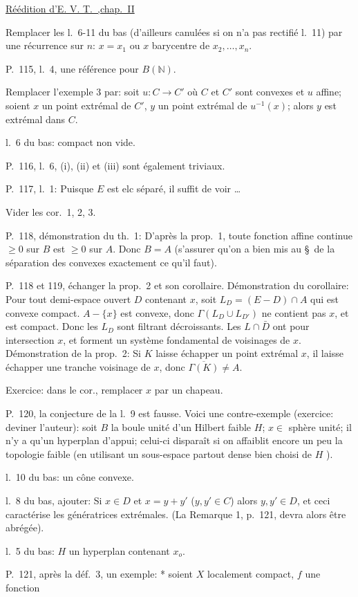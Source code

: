 \uline{Réédition d'E. V. T.\ ,chap.\ II} 

Remplacer les l.\ 6-11 du bas (d'ailleurs canulées si on n'a pas rectifié l.\ 11) par une récurrence sur $n$: $x=x_1$ ou $x$ barycentre de $x_2,\ldots,x_n$.

P.\ 115, l.\ 4, une référence pour $B(\mathbb{N})$.

Remplacer l'exemple 3 par: soit $u:C\longrightarrow C'$ où $C$ et $C'$ sont convexes et $u$ affine; soient $x$ un point extrémal de $C'$, $y$ un point extrémal de $u^{-1}(x)$; alors $y$ est extrémal dans $C$.

l.\ 6 du bas: compact non vide.

P.\ 116, l.\ 6, (i), (ii) et (iii) sont également triviaux.

P.\ 117, l.\ 1: Puisque $E$ est elc séparé, il suffit de voir \ldots

Vider les cor.\ 1, 2, 3.

P.\ 118, démonstration du th.\ 1: D'après la prop.\ 1, toute fonction affine continue $\geq0$ sur $B$ est $\geq0$ sur $A$. Donc $B=A$ (s'assurer qu'on a bien mis au \S\ de la séparation des convexes exactement ce qu'il faut).

P.\ 118 et 119, échanger la prop.\ 2 et son corollaire. Démonstration du corollaire: Pour tout demi-espace ouvert $D$ contenant $x$, soit $L_D=(E-D)\cap A$ qui est convexe compact. $A-\{x\}$ est convexe, donc $\Gamma(L_D\cup L_{D'})$ ne contient pas $x$, et est compact. Donc les $L_D$ sont filtrant décroissants. Les $L\cap\bar D$ ont pour intersection $x$, et forment un système fondamental de voisinages de $x$. Démonstration de la prop.\ 2: Si $K$ laisse échapper un point extrémal $x$, il laisse échapper une tranche voisinage de $x$, donc $\overline{\Gamma(K)}\neq A$.

Exercice: dans le cor., remplacer $x$ par un chapeau.

P.\ 120, la conjecture de la l.\ 9 est fausse. Voici une contre-exemple (exercice: deviner l'auteur): soit $B$ la boule unité d'un Hilbert faible $H$; $x\in$ sphère unité; il n'y a qu'un hyperplan d'appui; celui-ci disparaît si on affaiblit encore un peu la topologie faible (en utilisant un sous-espace partout dense bien choisi de $H$ ).

l.\ 10 du bas: un cône convexe.

l.\ 8 du bas, ajouter: Si $x\in D$ et $x=y+y'$ ($y,y'\in C$) alors $y,y'\in D$, et ceci caractérise les génératrices extrémales. (La Remarque 1, p.\ 121, devra alors être abrégée).

l.\ 5 du bas: $H$ un hyperplan contenant $x_o$.

P.\ 121, après la déf.\ 3, un exemple: * soient $X$ localement compact, $f$ une fonction

